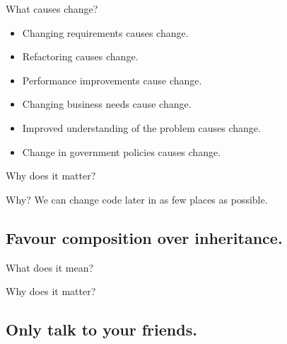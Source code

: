 \documentclass{beamer}
\begin{document}
\begin{frame}{What causes change?}
    \begin{itemize}
        \item Changing requirements causes change.
        \item Refactoring causes change. 
        \item Performance improvements cause change. 
        \item Changing business needs cause change. 
        \item Improved understanding of the problem causes change. 
        \item Change in government policies causes change.
    \end{itemize}
\end{frame}

\begin{frame}{Why does it matter?}
    \par Why? We can change code later in as few places as possible.
\end{frame}

\begin{frame}{}
    
\end{frame}

\begin{frame}{}
    
\end{frame}

\begin{frame}{}
    
\end{frame}

\subsection{Favour composition over inheritance.}

\begin{frame}{What does it mean?}
\end{frame}

\begin{frame}{Why does it matter?}
\end{frame}

\subsection{Only talk to your friends.}

\end{document}
